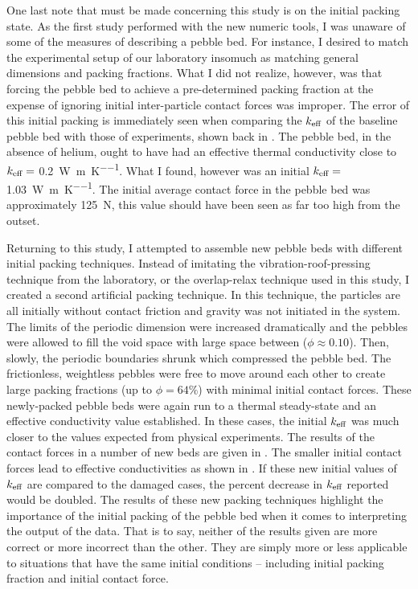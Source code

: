 One last note that must be made concerning this study is on the initial packing state. As the first study performed with the new numeric tools, I was unaware of some of the measures of describing a pebble bed. For instance, I desired to match the experimental setup of our laboratory insomuch as matching general dimensions and packing fractions. What I did not realize, however, was that forcing the pebble bed to achieve a pre-determined packing fraction at the expense of ignoring initial inter-particle contact forces was improper. The error of this initial packing is immediately seen when comparing the $k_\text{eff}$ of the baseline pebble bed with those of experiments, shown back in . The pebble bed, in the absence of helium, ought to have had an effective thermal conductivity close to $k_\text{eff} =$ \SI{0.2}{\watt\per\meter\per\kelvin}. What I found, however was an initial $k_\text{eff} = $\SI{1.03}{\watt\per\meter\per\kelvin}. The initial average contact force in the pebble bed was approximately \SI{125}{N}, this value should have been seen as far too high from the outset.

Returning to this study, I attempted to assemble new pebble beds with different initial packing techniques. Instead of imitating the vibration-roof-pressing technique from the laboratory, or the overlap-relax technique used in this study, I created a second artificial packing technique. In this technique, the particles are all initially without contact friction and gravity was not initiated in the system. The limits of the periodic dimension were increased dramatically and the pebbles were allowed to fill the void space with large space between ($\phi \approx 0.10$). Then, slowly, the periodic boundaries shrunk which compressed the pebble bed. The frictionless, weightless pebbles were free to move around each other to create large packing fractions (up to $\phi = 64\%$) with minimal initial contact forces. These newly-packed pebble beds were again run to a thermal steady-state and an effective conductivity value established. In these cases, the initial $k_\text{eff}$ was much closer to the values expected from physical experiments. The results of the contact forces in a number of new beds are given in . The smaller initial contact forces lead to effective conductivities as shown in . If these new initial values of $k_\text{eff}$ are compared to the damaged cases, the percent decrease in $k_\text{eff}$ reported would be doubled. The results of these new packing techniques highlight the importance of the initial packing of the pebble bed when it comes to interpreting the output of the data. That is to say, neither of the results given are more correct or more incorrect than the other. They are simply more or less applicable to situations that have the same initial conditions -- including initial packing fraction and initial contact force.


